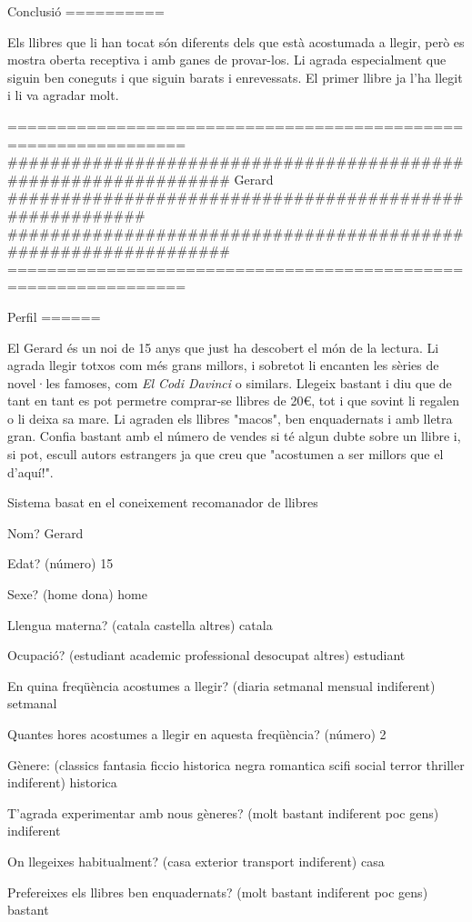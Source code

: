 Conclusió
==========

Els llibres que li han tocat són diferents dels que està acostumada a llegir, però es mostra oberta receptiva i amb ganes de provar-los.
Li agrada especialment que siguin ben coneguts i que siguin barats i enrevessats. El primer llibre ja l'ha llegit i li va agradar molt.


================================================================
################################################################
Gerard  ########################################################
################################################################
================================================================

Perfil
======

El Gerard és un noi de 15 anys que just ha descobert el món de la lectura. Li agrada llegir totxos com més grans millors, i sobretot li encanten les sèries de novel·les famoses, com \emph{El Codi Davinci} o similars. Llegeix bastant i diu que de tant en tant es pot permetre comprar-se llibres de 20€, tot i que sovint li regalen o li deixa sa mare. Li agraden els llibres "macos", ben enquadernats i amb lletra gran. Confia bastant amb el número de vendes si té algun dubte sobre un llibre i, si pot, escull autors estrangers ja que creu que "acostumen a ser millors que el d'aquí!".


Sistema basat en el coneixement recomanador de llibres

Nom? Gerard

Edat?  (número) 15

Sexe? (home dona) home

Llengua materna? (catala castella altres) catala

Ocupació? (estudiant academic professional desocupat altres) estudiant

En quina freqüència acostumes a llegir? (diaria setmanal mensual indiferent) setmanal

Quantes hores acostumes a llegir en aquesta freqüència? (número) 2

Gènere:  (classics fantasia ficcio historica negra romantica scifi social terror thriller indiferent) historica

T'agrada experimentar amb nous gèneres? (molt bastant indiferent poc gens) indiferent

On llegeixes habitualment? (casa exterior transport indiferent) casa

Prefereixes els llibres ben enquadernats? (molt bastant indiferent poc gens) bastant

